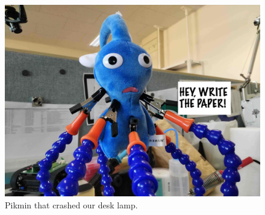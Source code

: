 {
  \begin{figure}[th!]
    \centering
    \includegraphics[width=1\linewidth]{fig/raw/tmp.jpg}
    \caption{Pikmin that crashed our desk lamp.}
    \label{fig:tmp}
  \end{figure}
}
